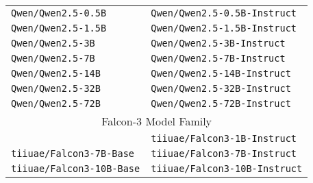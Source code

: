 \begin{table}[!htbp]
\begin{tabular}{l|l}
        \texttt{Qwen/Qwen2.5-0.5B} & \texttt{Qwen/Qwen2.5-0.5B-Instruct} \\
        \texttt{Qwen/Qwen2.5-1.5B} & \texttt{Qwen/Qwen2.5-1.5B-Instruct} \\
        \texttt{Qwen/Qwen2.5-3B} & \texttt{Qwen/Qwen2.5-3B-Instruct} \\
        \texttt{Qwen/Qwen2.5-7B} & \texttt{Qwen/Qwen2.5-7B-Instruct} \\
        \texttt{Qwen/Qwen2.5-14B} & \texttt{Qwen/Qwen2.5-14B-Instruct} \\
        \texttt{Qwen/Qwen2.5-32B} & \texttt{Qwen/Qwen2.5-32B-Instruct} \\ 
        \texttt{Qwen/Qwen2.5-72B} &\texttt{Qwen/Qwen2.5-72B-Instruct} \\
        \midrule
        \multicolumn{2}{c}{Falcon-3 Model Family \citep{tii2024falcon3}} \\
        & \texttt{tiiuae/Falcon3-1B-Instruct} \\
        \texttt{tiiuae/Falcon3-7B-Base} & \texttt{tiiuae/Falcon3-7B-Instruct} \\
        \texttt{tiiuae/Falcon3-10B-Base} & \texttt{tiiuae/Falcon3-10B-Instruct} \\
        \hline
    \end{tabular}
    \label{tab:models}
\end{table}

